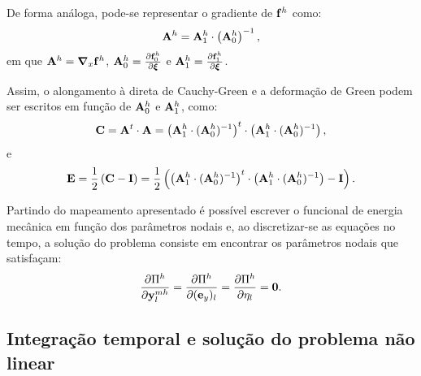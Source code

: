De forma análoga, pode-se representar o gradiente de  $\mathbf{f}^{h}$ como:
\begin{align}
	\mathbf{A}^{h} = \mathbf{A}^{h}_{1} \cdot \left(\mathbf{A}^{h}_{0}\right)^{-1} \label{eq:gradDeformation},
\end{align}
\noindent em que $\mathbf{A}^{h} = \boldsymbol{\nabla}_x \mathbf{f}^{h}$, $\mathbf{A}^{h}_{0} = \frac{\partial  \mathbf{f}^{h}_{0}} {\partial \boldsymbol{\xi}}$ e  $\mathbf{A}^{h}_{1} =  \frac{\partial  \mathbf{f}^{h}_{1}} {\partial \boldsymbol{\xi}}$.

Assim, o alongamento à direta de Cauchy-Green e a deformação de Green podem ser escritos em função de $\mathbf{A}^{h}_{0}$ e $\mathbf{A}^{h}_{1}$, como:
\begin{align}
	\mathbf{C} = \mathbf{A}^{t} \cdot \mathbf{A} = \left(\mathbf{A}^{h}_{1} \cdot (\mathbf{A}^{h}_{0})^{-1}\right)^{t} \cdot \left(\mathbf{A}^{h}_{1} \cdot (\mathbf{A}^{h}_{0})^{-1}\right),
\end{align}
\noindent e
\begin{align}
	\mathbf{E} = \frac{1}{2}\left(\mathbf{C} - \mathbf{I}\right) = \frac{1}{2}\left(\left(\mathbf{A}^{h}_{1} \cdot (\mathbf{A}^{h}_{0})^{-1}\right)^{t} \cdot \left(\mathbf{A}^{h}_{1} \cdot (\mathbf{A}^{h}_{0})^{-1}\right) - \mathbf{I}\right).
\end{align}

Partindo do mapeamento apresentado é possível escrever o funcional de energia mecânica em função dos parâmetros nodais e, ao discretizar-se as equações no tempo, a solução do problema consiste em encontrar os parâmetros nodais que satisfaçam:
\begin{align}
	\frac{\partial\Pi^{h}}{\partial \mathbf{y}_{l}^{mh}} = \frac{\partial\Pi^{h}}{\partial (\mathbf{e}_y)_l} = \frac{\partial\Pi^{h}}{\partial \eta_l} = \mathbf{0}.
\end{align}

\subsection{Integração temporal e solução do problema não linear}

